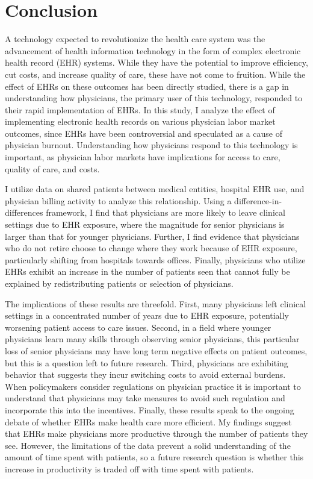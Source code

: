 \documentclass[12pt]{article}
\begin{document}
\section{Conclusion}

A technology expected to revolutionize the health care system was the advancement of health information technology in the form of complex electronic health record (EHR) systems. While they have the potential to improve efficiency, cut costs, and increase quality of care, these have not come to fruition. While the effect of EHRs on these outcomes has been directly studied, there is a gap in understanding how physicians, the primary user of this technology, responded to their rapid implementation of EHRs. In this study, I analyze the effect of implementing electronic health records on various physician labor market outcomes, since EHRs have been controversial and speculated as a cause of physician burnout. Understanding how physicians respond to this technology is important, as physician labor markets have implications for access to care, quality of care, and costs. 

I utilize data on shared patients between medical entities, hospital EHR use, and physician billing activity to analyze this relationship. Using a difference-in-differences framework, I find that physicians are more likely to leave clinical settings due to EHR exposure, where the magnitude for senior physicians is larger than that for younger physicians. Further, I find evidence that physicians who do not retire choose to change where they work because of EHR exposure, particularly shifting from hospitals towards offices. Finally, physicians who utilize EHRs exhibit an increase in the number of patients seen that cannot fully be explained by redistributing patients or selection of physicians. 

The implications of these results are threefold. First, many physicians left clinical settings in a concentrated number of years due to EHR exposure, potentially worsening patient access to care issues. Second, in a field where younger physicians learn many skills through observing senior physicians, this particular loss of senior physicians may have long term negative effects on patient outcomes, but this is a question left to future research. Third, physicians are exhibiting behavior that suggests they incur switching costs to avoid external burdens. When policymakers consider regulations on physician practice it is important to understand that physicians may take measures to avoid such regulation and incorporate this into the incentives. Finally, these results speak to the ongoing debate of whether EHRs make health care more efficient. My findings suggest that EHRs make physicians more productive through the number of patients they see. However, the limitations of the data prevent a solid understanding of the amount of time spent with patients, so a future research question is whether this increase in productivity is traded off with time spent with patients.  
 
\end{document}
